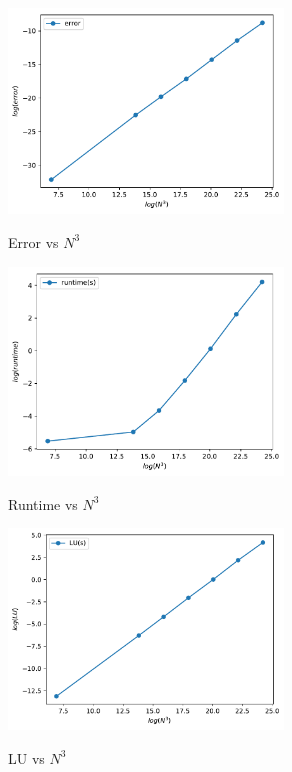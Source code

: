 \documentclass{article}
\begin{document}
\begin{figure}[H]
    \centering
    \caption{Error vs $N^3$}
    \includegraphics[width=0.65\textwidth]{src/error.pdf}
    \label{fig:error}
\end{figure}
\begin{figure}[H]
    \centering
    \caption{Runtime vs $N^3$}
    \includegraphics[width=0.65\textwidth]{src/runtime.pdf}
    \label{fig:runtime}
\end{figure}
\begin{figure}[H]
    \centering
    \caption{LU vs $N^3$}
    \includegraphics[width=0.65\textwidth]{src/LU.pdf}
    \label{fig:LU}
\end{figure}
\end{document}
